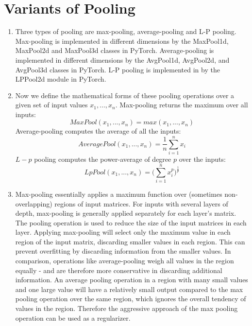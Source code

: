 \documentclass[a4paper]{article}
\begin{document}
\section{Variants of Pooling}
\begin{enumerate}
\item{Three types of pooling are max-pooling, average-pooling and L-P pooling. Max-pooling is implemented in different dimensions by the MaxPool1d, MaxPool2d and MaxPool3d classes in PyTorch. Average-pooling is implemented in different dimensions by the AvgPool1d, AvgPool2d, and AvgPool3d classes in PyTorch. L-P pooling is implemented in by the LPPool2d module in PyTorch. }
\item{  Now we define the mathematical forms of these pooling operations over a given set of input values $x_1,...,x_n$. 
Max-pooling returns the maximum over all inputs:
$$MaxPool(x_1,...,x_n) = max( x_1, ...,x_n) $$
Average-pooling computes the average of all the inputs:
$$AveragePool(x_1,...,x_n) = \frac{1}{n} \sum_{i=1}^n x_i$$
$L-p$ pooling computes the power-average of degree $p$ over the inputs:
$$LpPool(x_1,...,x_n) = \Bigg( \sum_{i=1}^n x_i^p \Bigg)^{\frac{1}{p}}$$

}
\item{ Max-pooling essentially applies a maximum function over (sometimes non-overlapping) regions of input matrices. For inputs with several layers of depth, max-pooling is generally applied separately for each layer's matrix. The pooling operation is used to reduce the size of the input matrices in each layer. Applying max-pooling will select only the maximum value in each region of the input matrix, discarding smaller values in each region. This can prevent overfitting by discarding information from the smaller values. In comparison, operations like average-pooling weigh all values in the region equally - and are therefore more conservative in discarding additional information. An average pooling operation in a region with many small values and one large value will have a relatively small output compared to the max pooling operation over the same region, which ignores the overall tendency of values in the region. Therefore the aggressive approach of the max pooling operation can be used as a regularizer. 
}
\end{enumerate}
\end{document}
